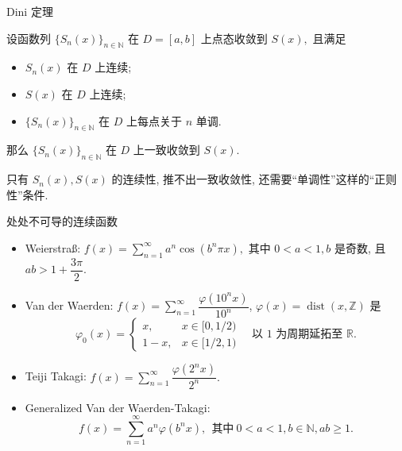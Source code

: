 
\begin{frame}{Dini 定理}

\begin{thm}[Dini 定理]
设函数列 $\{S_n(x)\}_{n\in\mathbb{N}}$ 在 $D = [a, b]$ 上点态收敛到 $S(x),$ 且满足
\begin{itemize}
\item $S_n(x)$ 在 $D$ 上连续;
\item $S(x)$ 在 $D$ 上连续;
\item $\{S_n(x)\}_{n\in\mathbb{N}}$ 在 $D$ 上每点关于 $n$ 单调.
\end{itemize}
那么 $\{S_n(x)\}_{n\in\mathbb{N}}$ 在 $D$ 上一致收敛到 $S(x).$
\end{thm}

\pause

\begin{attnblock}
只有 $S_n(x), S(x)$ 的连续性, 推不出一致收敛性, 还需要``单调性''这样的``正则性''条件.
\end{attnblock}

\end{frame}


\begin{frame}{处处不可导的连续函数}

\begin{itemize}[<+->]
\item Weierstra\ss: $f(x) = \sum\limits_{n=1}^\infty a^n \cos(b^n \pi x),$ 其中 $0 < a < 1, b$ 是奇数, 且 $ab > 1 + \dfrac{3\pi}{2}.$
\item Van der Waerden: $f(x) = \sum\limits_{n=1}^\infty \dfrac{\varphi(10^n x)}{10^n}$, $\varphi(x) = \operatorname{dist}(x, \mathbb{Z})$ 是
\[\varphi_0(x) = \begin{cases} x, & x \in [0, 1/2) \\ 1-x, & x \in [1/2, 1) \end{cases} \quad \text{以 $1$ 为周期延拓至 $\mathbb{R}$}.\]
\item Teiji Takagi: $f(x) = \sum\limits_{n=1}^\infty \dfrac{\varphi(2^n x)}{2^n}.$
\item Generalized Van der Waerden-Takagi:
\[f(x) = \sum\limits_{n=1}^\infty a^n \varphi(b^n x), ~~ \text{其中} ~ 0 < a < 1, b \in \mathbb{N}, ab \geqslant 1.\]
\end{itemize}

\end{frame}

